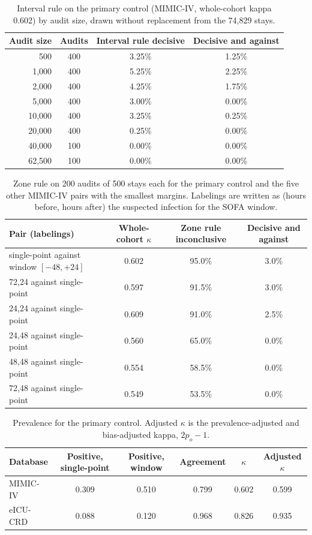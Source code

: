 \documentclass[10pt]{article}
\theoremstyle{definition}
\begin{document}
\begin{table}[h]
\centering\footnotesize
\begin{tabular}{@{}rccc@{}}
\toprule
Audit size & Audits & Interval rule decisive & Decisive and against\\
\midrule
500 & 400 & 3.25\% & 1.25\%\\
1{,}000 & 400 & 5.25\% & 2.25\%\\
2{,}000 & 400 & 4.25\% & 1.75\%\\
5{,}000 & 400 & 3.00\% & 0.00\%\\
10{,}000 & 400 & 3.25\% & 0.25\%\\
20{,}000 & 400 & 0.25\% & 0.00\%\\
40{,}000 & 100 & 0.00\% & 0.00\%\\
62{,}500 & 100 & 0.00\% & 0.00\%\\
\bottomrule
\end{tabular}
\caption{Interval rule on the primary control (MIMIC-IV, whole-cohort kappa 0.602) by audit size, drawn without replacement from the 74,829 stays.}
\label{tab:rulesize}
\end{table}

\begin{table}[h]
\centering\footnotesize
\begin{tabular}{@{}lccc@{}}
\toprule
Pair (labelings) & Whole-cohort $\kappa$ & Zone rule inconclusive & Decisive and against\\
\midrule
single-point against window $[-48,+24]$ & 0.602 & 95.0\% & 3.0\%\\
72,24 against single-point & 0.597 & 91.5\% & 3.0\%\\
24,24 against single-point & 0.609 & 91.0\% & 2.5\%\\
24,48 against single-point & 0.560 & 65.0\% & 0.0\%\\
48,48 against single-point & 0.554 & 58.5\% & 0.0\%\\
72,48 against single-point & 0.549 & 53.5\% & 0.0\%\\
\bottomrule
\end{tabular}
\caption{Zone rule on 200 audits of 500 stays each for the primary control and the five other MIMIC-IV pairs with the smallest margins. Labelings are written as (hours before, hours after) the suspected infection for the SOFA window.}
\label{tab:zone}
\end{table}

\begin{table}[h]
\centering\footnotesize
\begin{tabular}{@{}lccccc@{}}
\toprule
Database & Positive, single-point & Positive, window & Agreement & $\kappa$ & Adjusted $\kappa$\\
\midrule
MIMIC-IV & 0.309 & 0.510 & 0.799 & 0.602 & 0.599\\
eICU-CRD & 0.088 & 0.120 & 0.968 & 0.826 & 0.935\\
\bottomrule
\end{tabular}
\caption{Prevalence for the primary control. Adjusted $\kappa$ is the prevalence-adjusted and bias-adjusted kappa, $2p_o-1$.}
\label{tab:prev}
\end{table}
\FloatBarrier
\end{document}
